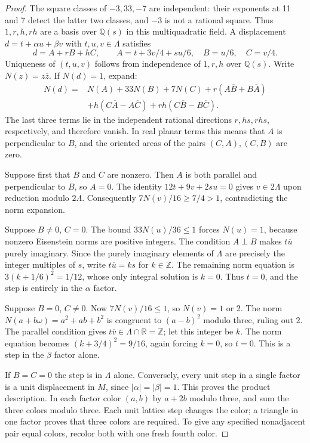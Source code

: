 \documentclass[11pt,letterpaper]{article}
\begin{document}
\begin{proof}
The square classes of \(-3,33,-7\) are independent: their
exponents at 11 and 7 detect the latter two classes, and
\(-3\) is not a rational square. Thus \(1,r,h,rh\) are a basis
over \(\mathbb Q(s)\) in this multiquadratic field.
A displacement \(d=t+\alpha u+\beta v\) with \(t,u,v\in\Lambda\)
satisfies
\[
 d=A+rB+hC,\qquad A=t+3v/4+su/6,\quad B=u/6,\quad C=v/4.
\]
Uniqueness of \((t,u,v)\) follows from independence of
\(1,r,h\) over \(\mathbb Q(s)\). Write \(N(z)=z\overline z\).
If \(N(d)=1\), expand:
\[
\begin{split}
 N(d)={}&N(A)+33N(B)+7N(C)
   +r(A\overline B+B\overline A)\\
 &+h(C\overline A-A\overline C)
   +rh(C\overline B-B\overline C).
\end{split}
\]
The last three terms lie in the independent rational directions
\(r,hs,rhs\), respectively, and therefore vanish. In real planar
terms this means that \(A\) is perpendicular to \(B\), and the
oriented areas of the pairs \((C,A),(C,B)\) are zero.

Suppose first that \(B\) and \(C\) are nonzero. Then \(A\)
is both parallel and perpendicular to \(B\), so \(A=0\).
The identity \(12t+9v+2su=0\) gives \(v\in2\Lambda\) upon
reduction modulo \(2\Lambda\). Consequently
\(7N(v)/16\ge7/4>1\), contradicting the norm expansion.

Suppose \(B\ne0\), \(C=0\). The bound \(33N(u)/36\le1\)
forces \(N(u)=1\), because nonzero Eisenstein norms are positive
integers. The condition \(A\perp B\) makes
\(t\overline u\) purely imaginary. Since the purely imaginary
elements of \(\Lambda\) are precisely the integer multiples of
\(s\), write \(t\overline u=ks\) for \(k\in\mathbb Z\).
The remaining norm equation is
\(3(k+1/6)^2=1/12\), whose only integral solution is \(k=0\).
Thus \(t=0\), and the step is entirely in the \(\alpha\) factor.

Suppose \(B=0\), \(C\ne0\). Now \(7N(v)/16\le1\), so
\(N(v)=1\) or 2. The norm \(N(a+b\omega)=a^2+ab+b^2\)
is congruent to \((a-b)^2\) modulo three, ruling out 2.
The parallel condition gives \(t\overline v\in\Lambda\cap\mathbb R
=\mathbb Z\); let this integer be \(k\). The norm equation becomes
\((k+3/4)^2=9/16\), again forcing \(k=0\), so \(t=0\).
This is a step in the \(\beta\) factor alone.

If \(B=C=0\) the step is in \(\Lambda\) alone. Conversely,
every unit step in a single factor is a unit displacement in
\(M\), since \(|\alpha|=|\beta|=1\). This proves the product
description. In each factor color \((a,b)\) by \(a+2b\) modulo
three, and sum the three colors modulo three. Each unit lattice
step changes the color; a triangle in one factor proves that
three colors are required. To give any specified nonadjacent pair
equal colors, recolor both with one fresh fourth color.
\end{proof}
\end{document}
